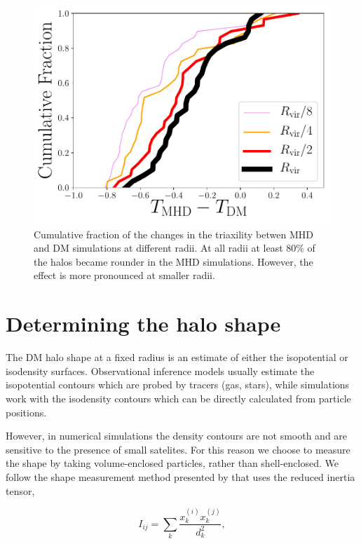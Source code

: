 \documentclass[a4paper,fleqn,usenatbib]{mnras}
\begin{document}
\begin{figure}
\includegraphics[width=0.9\columnwidth]{delta_triaxialiy_distro.pdf}
\caption{Cumulative fraction of the changes in the triaxility betwen
  MHD and DM simulations at different radii. 
  At all radii at least $80\%$ of the halos became rounder in the MHD
  simulations. 
  However, the effect is more pronounced at smaller radii.}
\label{fig:triax_difference}
\end{figure}

\section{Determining the halo shape}


The DM halo shape at a fixed radius is an estimate of either
the isopotential or isodensity surfaces.  
Observational inference models usually estimate the 
isopotential contours which are probed by tracers (gas, stars), while
simulations work with the isodensity contours which can be directly
calculated from particle positions.  

However, in numerical simulations the density contours are not smooth
and are sensitive to the presence of small satelites. 
For this reason we choose to measure the shape by taking
volume-enclosed particles, rather than shell-enclosed.  
We follow the shape measurement method presented by
\cite{Allgood_et_al._2006} that uses the reduced
inertia tensor,     

\begin{equation}
I_{ij} = \sum_k \frac{x_k^{(i)}x_k^{(j)}}{d^2_k},
\label{eq:inertia}
\end{equation}
\end{document}

